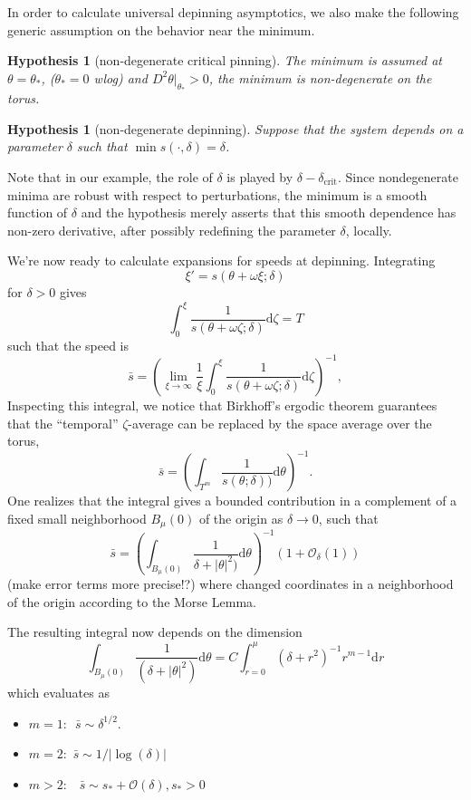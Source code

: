 \documentclass[letterpaper,11pt]{article}
\newcommand{\rmd}{\mathrm{d}}
\newcommand{\rmo}{{\scriptstyle\mathcal{O}}}
\newcommand{\rmO}{\mathcal{O}}
\numberwithin{equation}{section}
\theoremstyle{plain}
\newtheorem{Hypothesis}[theorem]{Hypothesis}
\begin{document}
In order to calculate universal depinning asymptotics, we also make the following generic assumption on the behavior near the minimum.

\begin{Hypothesis}[non-degenerate critical pinning]
The minimum is assumed at $\theta=\theta_*$, ($\theta_*=0$ wlog) and $D^2\theta|_{\theta_*}>0$, the minimum is non-degenerate on the torus. 
\end{Hypothesis}

\begin{Hypothesis}[non-degenerate depinning]
Suppose that the system depends on a parameter $\delta$ such that $\min s(\cdot,\delta)=\delta$. 
\end{Hypothesis} 
Note that in our example, the role of $\delta$ is played by $\delta-\delta_\mathrm{crit}$. Since nondegenerate minima are robust with respect to perturbations, the minimum  is a smooth function of $\delta$ and the hypothesis merely asserts that this smooth dependence has non-zero derivative, after possibly redefining the parameter $\delta$, locally. 
 
We're now ready to calculate expansions for speeds at depinning. Integrating
\[
\xi'=s(\theta+\omega\xi;\delta) 
\]
for $\delta>0$ gives
\[
\int_0^\xi \frac{1}{s(\theta+\omega\zeta;\delta)} \rmd \zeta = T
\]
such that the speed is
\[
\bar{s}=\left(\lim_{\xi \to \infty}\frac{1}{\xi}\int_0^\xi \frac{1}{s(\theta+\omega\zeta;\delta)}\rmd \zeta	\right)^{-1},
\]
Inspecting this integral, we notice that Birkhoff's ergodic theorem guarantees that the ``temporal'' $\zeta$-average can be replaced by the space average over the torus,
\[
\bar{s}=\left(\int_{T^m} \frac{1}{s(\theta;\delta))}\rmd\theta\right)^{-1}.
\]
One realizes that the integral gives a bounded contribution in a complement of a fixed small neighborhood $B_\mu(0)$ of the origin as $\delta\to 0$, such that 
\[\bar{s}=\left(\int_{B_\mu(0)} \frac{1}{\delta+|\theta|^2)}\rmd\theta\right)^{-1}\left(1+\rmo_\delta(1)\right)\]
(make error terms more precise!?) where changed coordinates in a neighborhood of the origin according to the Morse Lemma. 

The resulting integral now depends on the dimension
\[
\int_{B_\mu(0)} \frac{1}{(\delta+|\theta|^2)}\rmd\theta =C\int_{r=0}^\mu (\delta+r^2)^{-1}r^{m-1}\rmd r
\]
which evaluates as
\begin{itemize}
\item 
$m=1:$\ 
$\bar{s}\sim \delta^{1/2}$.
\item 

$m=2:$ $\bar{s}\sim 1/|\log(\delta)|$
\item 
$m>2:$
\ $\bar{s}\sim s_*+\rmO(\delta), s_*>0$
\end{itemize}
\end{document}
